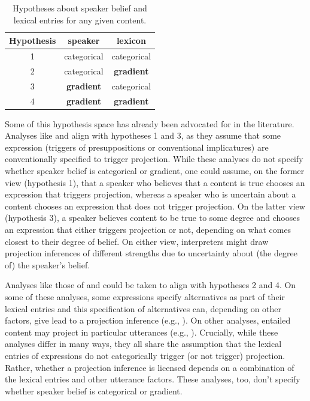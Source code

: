 \documentclass[11pt,fleqn]{article}
\newcommand{\6}{\mbox{$[\hspace*{-.6mm}[$}}
\newcommand{\9}{\mbox{$]\hspace*{-.6mm}]$}}
\begin{document}
\begin{table}[h]
\centering
\begin{tabular}{c | c c}
Hypothesis & speaker & lexicon  \\ \hline\hline
1 & categorical & categorical  \\ 
2 & categorical & {\bf gradient}  \\ 
3 & {\bf gradient} & categorical \\ 
4 & {\bf gradient} & {\bf gradient}  \\ 
\hline
\end{tabular}
\caption{Hypotheses about speaker belief and lexical entries for any given content.}\label{t:hyp}
\end{table}

Some of this hypothesis space has already been advocated for in the literature. Analyses like \citealt{heim83,vds92} and \citealt{potts05} align with hypotheses 1 and 3, as they assume that some expression (triggers of presuppositions or conventional implicatures) are conventionally specified to trigger projection. While these analyses do not specify whether speaker belief is categorical or gradient, one could assume, on the former view (hypothesis 1), that a speaker who believes that a content is true chooses an expression that triggers projection, whereas a speaker who is uncertain about a content chooses an expression that does not trigger projection. On the latter view (hypothesis 3), a speaker believes content to be true to some degree and chooses an expression that either triggers projection or not, depending on what comes closest to their degree of belief. On either view, interpreters might draw projection inferences of different strengths due to uncertainty about (the degree of) the speaker's belief. 

Analyses like those of \citealt{abrusan2011,abrusan2016,abusch02,abusch10,romoli2015} and \citealt{brst-salt10,simons-etal2017} could be taken to align with hypotheses 2 and 4. On some of these analyses, some expressions specify alternatives as part of their lexical entries and this specification of alternatives can, depending on other factors, give lead to a projection inference (e.g., \citealt{abusch02,abusch10,romoli2015}). On other analyses, entailed content may project in particular utterances  (e.g., \citealt{abrusan2011,abrusan2016,brst-salt10,simons-etal2017}). Crucially, while these analyses differ in many ways, they all share the assumption that the lexical entries of expressions do not categorically trigger (or not trigger) projection. Rather, whether a projection inference is licensed depends on a combination of the lexical entries and other utterance factors. These analyses, too, don't specify whether speaker belief is categorical or gradient.
\end{document}
